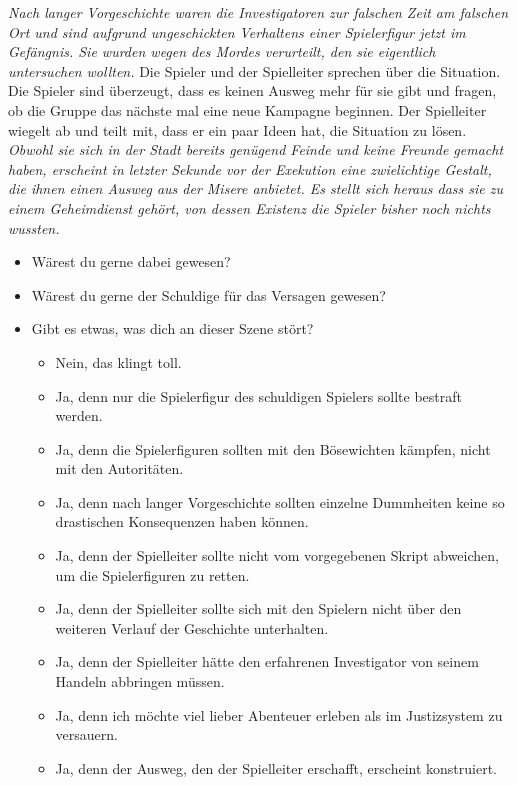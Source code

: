 \documentclass{article}
\begin{document}
\textit{Nach langer Vorgeschichte waren die Investigatoren zur
  falschen Zeit am falschen Ort und sind aufgrund ungeschickten
  Verhaltens einer Spielerfigur jetzt im Gefängnis. Sie wurden wegen
  des Mordes verurteilt, den sie eigentlich untersuchen wollten.} Die
Spieler und der Spielleiter sprechen über die Situation. Die Spieler
sind überzeugt, dass es keinen Ausweg mehr für sie gibt und fragen, ob
die Gruppe das nächste mal eine neue Kampagne beginnen. Der
Spielleiter wiegelt ab und teilt mit, dass er ein paar Ideen hat, die
Situation zu lösen. \textit{Obwohl sie sich in der Stadt bereits
  genügend Feinde und keine Freunde gemacht haben, erscheint in
  letzter Sekunde vor der Exekution eine zwielichtige Gestalt, die
  ihnen einen Ausweg aus der Misere anbietet. Es stellt sich heraus
  dass sie zu einem Geheimdienst gehört, von dessen Existenz die
  Spieler bisher noch nichts wussten.}
\begin{itemize}
\item  Wärest du gerne dabei gewesen?
\item  Wärest du gerne der Schuldige für das Versagen gewesen?
\item  Gibt es etwas, was dich an dieser Szene stört?
  \begin{itemize}
  \item Nein, das klingt toll.
  \item Ja, denn nur die Spielerfigur des schuldigen Spielers sollte bestraft werden.
  \item Ja, denn die Spielerfiguren sollten mit den Bösewichten kämpfen, nicht mit den Autoritäten.
  \item Ja, denn nach langer Vorgeschichte sollten einzelne Dummheiten keine so drastischen Konsequenzen haben können.
  \item Ja, denn der Spielleiter sollte nicht vom vorgegebenen Skript abweichen, um die Spielerfiguren zu retten.
  \item Ja, denn der Spielleiter sollte sich mit den Spielern nicht über den weiteren Verlauf der Geschichte unterhalten.
  \item Ja, denn der Spielleiter hätte den erfahrenen Investigator von seinem Handeln abbringen müssen.
  \item Ja, denn ich möchte viel lieber Abenteuer erleben als im Justizsystem zu versauern.
  \item Ja, denn der Ausweg, den der Spielleiter erschafft, erscheint konstruiert.
  \end{itemize}
\end{itemize}
\end{document}
